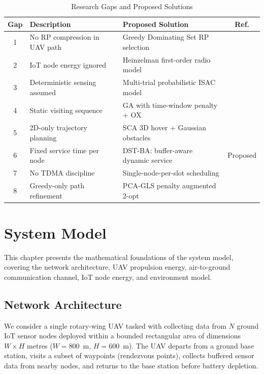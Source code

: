 \documentclass[12pt, a4paper, oneside]{report}
\begin{document}
\begin{table}[htbp]
\centering
\caption{Research Gaps and Proposed Solutions}
\label{tab:gaps}
\small
\begin{tabularx}{\textwidth}{c p{5cm} p{5.5cm} c}
\toprule
\textbf{Gap} & \textbf{Description} & \textbf{Proposed Solution} & \textbf{Ref.} \\
\midrule
1 & No RP compression in UAV path & Greedy Dominating Set RP selection & \cite{donipati2025tnsm} \\
2 & IoT node energy ignored & Heinzelman first-order radio model & \cite{heinzelman2000leach} \\
3 & Deterministic sensing assumed & Multi-trial probabilistic ISAC model & \cite{zheng2025tvt} \\
4 & Static visiting sequence & GA with time-window penalty + OX & \cite{zheng2025tvt} \\
5 & 2D-only trajectory planning & SCA 3D hover + Gaussian obstacles & \cite{zheng2025tvt} \\
6 & Fixed service time per node & DST-BA: buffer-aware dynamic service & Proposed \\
7 & No TDMA discipline & Single-node-per-slot scheduling & \cite{wang2022iot} \\
8 & Greedy-only path refinement & PCA-GLS penalty augmented 2-opt & \cite{donipati2025tnsm} \\
\bottomrule
\end{tabularx}
\end{table}


\chapter{System Model}
\label{ch:system_model}

This chapter presents the mathematical foundations of the system model, covering the network architecture, UAV propulsion energy, air-to-ground communication channel, IoT node energy, and environment model.

\section{Network Architecture}

We consider a single rotary-wing UAV tasked with collecting data from $N$ ground IoT sensor nodes deployed within a bounded rectangular area of dimensions $W \times H$ metres ($W = 800$~m, $H = 600$~m). The UAV departs from a ground base station, visits a subset of waypoints (rendezvous points), collects buffered sensor data from nearby nodes, and returns to the base station before battery depletion.
\end{document}

